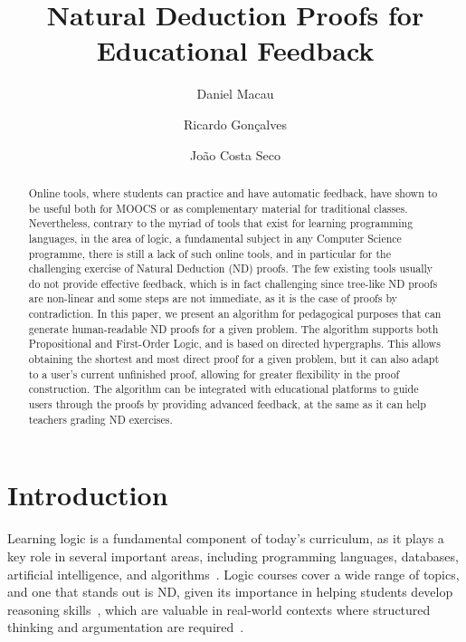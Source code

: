 \documentclass[runningheads]{llncs}
\begin{document}
\title{Natural Deduction Proofs for Educational Feedback}

\author{Daniel Macau
\and Ricardo Gonçalves
\and João Costa Seco}


\maketitle 

\begin{abstract}
Online tools, where students can practice and have automatic feedback, have shown to be useful both for MOOCS or as complementary material for traditional classes. Nevertheless, contrary to the myriad of tools that exist for learning programming languages, in the area of logic, a fundamental subject in any Computer Science programme, there is still a lack of such online tools, and in particular for the challenging exercise of Natural Deduction (ND) proofs. The few existing tools usually do not provide effective feedback, which is in fact challenging since tree-like ND proofs are non-linear and some steps are not immediate, as it is the case of proofs by contradiction. In this paper, we present an algorithm for pedagogical purposes that can generate human-readable ND proofs for a given problem. The algorithm supports both Propositional and First-Order Logic, and is based on directed hypergraphs. This allows obtaining the shortest and most direct proof for a given problem, but it can also adapt to a user’s current unfinished proof, allowing for greater flexibility in the proof construction. The algorithm can be integrated with educational platforms to guide users through the proofs by providing advanced feedback, at the same as it can help teachers grading ND exercises. 

\end{abstract}

\section{Introduction}
Learning logic is a fundamental component of today’s curriculum, as it plays a key role in several important areas, including programming languages, databases, artificial intelligence, and algorithms~\cite{logicincomputer}. Logic courses cover a wide range of topics, and one that stands out is ND, given its importance in helping students develop reasoning skills~\cite{autogeneratingnd}, which are valuable in real-world contexts where structured thinking and argumentation are required~\cite{vonPlato_2014}.
\end{document}
